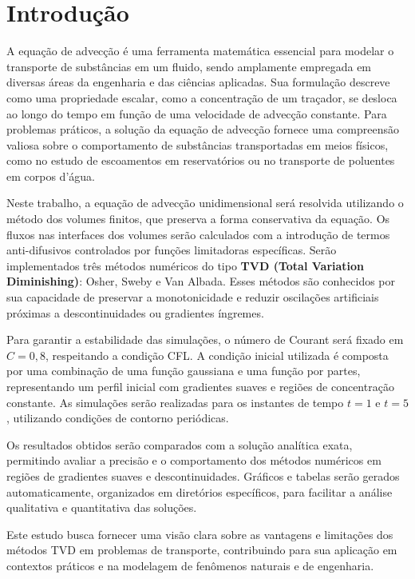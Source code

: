 \section{Introdução}

A equação de advecção é uma ferramenta matemática essencial para modelar o transporte de substâncias em um fluido, sendo amplamente empregada em diversas áreas da engenharia e das ciências aplicadas. Sua formulação descreve como uma propriedade escalar, como a concentração de um traçador, se desloca ao longo do tempo em função de uma velocidade de advecção constante. Para problemas práticos, a solução da equação de advecção fornece uma compreensão valiosa sobre o comportamento de substâncias transportadas em meios físicos, como no estudo de escoamentos em reservatórios ou no transporte de poluentes em corpos d'água.

Neste trabalho, a equação de advecção unidimensional será resolvida utilizando o método dos volumes finitos, que preserva a forma conservativa da equação. Os fluxos nas interfaces dos volumes serão calculados com a introdução de termos anti-difusivos controlados por funções limitadoras específicas. Serão implementados três métodos numéricos do tipo \textbf{TVD (Total Variation Diminishing)}: Osher, Sweby e Van Albada. Esses métodos são conhecidos por sua capacidade de preservar a monotonicidade e reduzir oscilações artificiais próximas a descontinuidades ou gradientes íngremes.

Para garantir a estabilidade das simulações, o número de Courant será fixado em \(C = 0,8\), respeitando a condição CFL. A condição inicial utilizada é composta por uma combinação de uma função gaussiana e uma função por partes, representando um perfil inicial com gradientes suaves e regiões de concentração constante. As simulações serão realizadas para os instantes de tempo \(t = 1\) e \(t = 5\), utilizando condições de contorno periódicas.

Os resultados obtidos serão comparados com a solução analítica exata, permitindo avaliar a precisão e o comportamento dos métodos numéricos em regiões de gradientes suaves e descontinuidades. Gráficos e tabelas serão gerados automaticamente, organizados em diretórios específicos, para facilitar a análise qualitativa e quantitativa das soluções.

Este estudo busca fornecer uma visão clara sobre as vantagens e limitações dos métodos TVD em problemas de transporte, contribuindo para sua aplicação em contextos práticos e na modelagem de fenômenos naturais e de engenharia.
